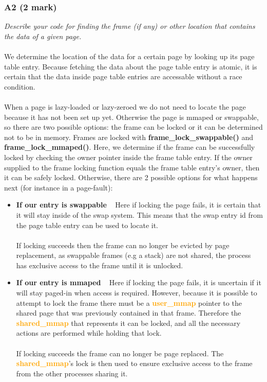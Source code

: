 \documentclass{report}
\newcommand{\question}[1]{\textit{#1} \ }
\newcommand{\bullpara}[2]{\item \textbf{#1} \ #2}
\newcommand{\fun}[1]{\textcolor{Emerald}{\textbf{#1}}}
\newcommand{\struct}[1]{\textcolor{orange}{\textbf{#1}}}
\newcommand{\compitem}[1]{\begin{itemize}\setlength\itemsep{-0.1em}#1\end{itemize}}
\begin{document}
			\subsubsection*{A2 (2 mark)}
				\question{Describe your code for finding the frame (if any) or 
				other location that contains the data of a given page.} 
				\\
				\\We determine the location of the data for a certain page by looking up its
				page table entry. Because fetching the data about the page table entry is atomic,
				it is certain that the data inside page table entries are accessable without a 
				race condition.
				\\
				\\When a page is lazy-loaded or lazy-zeroed we do not need 
				to locate the page because it has not been set up yet.
				Otherwise the page is mmaped or swappable, so there are two 
				possible options: the frame can be locked or it can be 
				determined not to be in memory.
				Frames are locked with \fun{frame\_lock\_swappable()} and 
				\fun{frame\_lock\_mmaped()}. Here, we determine if the frame can be
				successfully locked by checking the owner pointer inside the 
				frame table entry. If the owner supplied to the frame locking function 
				equals the frame table entry's owner, then it can be safely locked.
				Otherwise, there are 2 possible options for what happens 
				next (for instance in a page-fault):
				\compitem{
					\bullpara{If our entry is swappable}{
						Here if locking the page fails, it is certain that
						it will stay inside of the swap system. This means that
						the swap entry id from the page table entry can be used to locate it.
						\\
						\\ If locking succeeds then the frame can no longer be evicted 
						by page replacement, as swappable frames (e.g a stack) are not 
						shared, the process has exclusive access to the frame until it is unlocked.
					}
					\bullpara{If our entry is mmaped}{
						Here if locking the page fails, it is uncertain 
						if it will stay paged-in when access is required. 
						However, because it is possible to attempt to lock the
						frame there must be a \struct{user\_mmap} pointer 
						to the shared page that was previously contained in that frame.
						Therefore the \struct{shared\_mmap} that represents it can be locked, 
						and all the necessary actions are performed while holding that lock.
						\\
						\\ If locking succeeds the frame can no longer be page replaced. 
						The \struct{shared\_mmap}'s lock is then used to ensure
						 exclusive access to the frame from the other processes sharing it.
					}
				}
\end{document}
